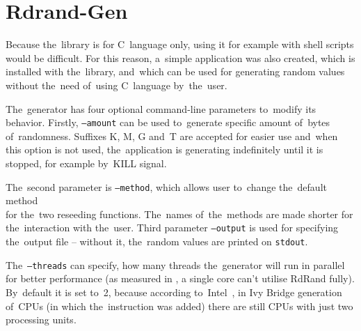 
\chapter{Rdrand-Gen} \label{chap:generator}
\par{
Because the~library is for C~language only, using it for example with shell scripts would be difficult. For this reason, a~simple application was also created, which is installed with the~library, and~which can be used for generating random values without the~need of~using C~language by~the~user.
}

\par{
The~generator has four optional command-line parameters to~modify its behavior. Firstly, {\tt --amount} can be used to~generate specific amount of~bytes of~randomness. Suffixes K, M, G and~T are accepted for easier use and~when this option is not used, the~application is generating indefinitely until it is stopped, for example by~KILL signal.
}

\par{
The~second parameter is {\tt --method}, which allows user to~change the~default method \\ for the~two reseeding functions. The~names of~the~methods are made shorter for the~interaction with the~user. Third parameter {\tt --output} is used for specifying the~output file -- without it, the~random values are printed on {\tt stdout}. 
}

\par{
The~{\tt --threads} can specify, how many threads the~generator will run in parallel for better performance (as measured in , a single core can't utilise RdRand fully). By~default it is set to~2, because according to~Intel~\cite{IntelArk}, in Ivy Bridge generation of~CPUs (in which the~instruction was added) there are still CPUs with just two processing units. 
}

